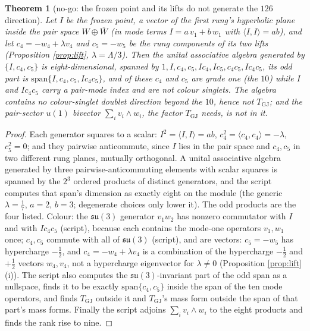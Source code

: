 \documentclass[11pt]{article}
\newtheorem{theorem}{Theorem}[section]
\theoremstyle{definition}
\newcommand{\ip}[2]{\langle #1, #2\rangle}
\newcommand{\su}{\mathfrak{su}}
\begin{document}
\begin{theorem}[no-go: the frozen point and its lifts do not generate the $126$ direction]\label{thm:frozennogo}
Let $I$ be the frozen point, a vector of the first rung's hyperbolic plane inside the pair space $W \oplus \overline{W}$ (in mode terms $I = a\,v_{1} + b\,w_{1}$ with $\ip{I}{I} = ab$), and let $c_{4} = -w_{4} + \lambda v_{4}$ and $c_{5} = -w_{5}$ be the rung components of its two lifts (Proposition \ref{prop:lift}, $\lambda = \Lambda/3$). Then the unital associative algebra generated by $\{I, c_{4}, c_{5}\}$ is eight-dimensional, spanned by $1, I, c_{4}, c_{5}, Ic_{4}, Ic_{5}, c_{4}c_{5}, Ic_{4}c_{5}$, its odd part is $\mathrm{span}\{I, c_{4}, c_{5}, Ic_{4}c_{5}\}$, and of these $c_{4}$ and $c_{5}$ are grade one (the $10$) while $I$ and $Ic_{4}c_{5}$ carry a pair-mode index and are not colour singlets. The algebra contains no colour-singlet doublet direction beyond the $10$, hence not $T_{\mathrm{GJ}}$; and the pair-sector $u(1)$ bivector $\sum_{i}v_{i}\wedge w_{i}$, the factor $T_{\mathrm{GJ}}$ needs, is not in it.
\end{theorem}

\begin{proof}
Each generator squares to a scalar: $I^{2} = \ip{I}{I} = ab$, $c_{4}^{2} = \ip{c_{4}}{c_{4}} = -\lambda$, $c_{5}^{2} = 0$; and they pairwise anticommute, since $I$ lies in the pair space and $c_{4}, c_{5}$ in two different rung planes, mutually orthogonal. A unital associative algebra generated by three pairwise-anticommuting elements with scalar squares is spanned by the $2^{3}$ ordered products of distinct generators, and the script computes that span's dimension as exactly eight on the module (the generic $\lambda = \tfrac17$, $a = 2$, $b = 3$; degenerate choices only lower it). The odd products are the four listed. Colour: the $\su(3)$ generator $v_{1}w_{2}$ has nonzero commutator with $I$ and with $Ic_{4}c_{5}$ (script), because each contains the mode-one operators $v_{1}, w_{1}$ once; $c_{4}, c_{5}$ commute with all of $\su(3)$ (script), and are vectors: $c_{5} = -w_{5}$ has hypercharge $-\tfrac12$, and $c_{4} = -w_{4} + \lambda v_{4}$ is a combination of the hypercharge $-\tfrac12$ and $+\tfrac12$ vectors $w_{4}, v_{4}$, not a hypercharge eigenvector for $\lambda \ne 0$ (Proposition \ref{prop:lift}(i)). The script also computes the $\su(3)$-invariant part of the odd span as a nullspace, finds it to be exactly $\mathrm{span}\{c_{4}, c_{5}\}$ inside the span of the ten mode operators, and finds $T_{\mathrm{GJ}}$ outside it and $T_{\mathrm{GJ}}$'s mass form outside the span of that part's mass forms. Finally the script adjoins $\sum_{i}v_{i}\wedge w_{i}$ to the eight products and finds the rank rise to nine.
\end{proof}
\end{document}
